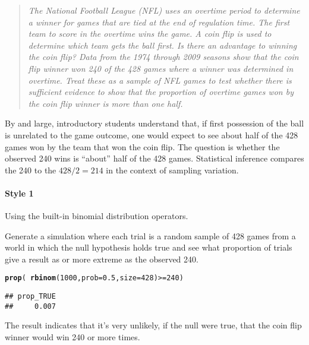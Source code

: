 \documentclass[11pt]{article}\usepackage[]{graphicx}\usepackage[]{color}
\makeatletter
\newcommand{\hlnum}[1]{\textcolor[rgb]{0.686,0.059,0.569}{#1}}%
\newcommand{\hlopt}[1]{\textcolor[rgb]{0,0,0}{#1}}%
\newcommand{\hlstd}[1]{\textcolor[rgb]{0.345,0.345,0.345}{#1}}%
\newcommand{\hlkwc}[1]{\textcolor[rgb]{0.333,0.667,0.333}{#1}}%
\newcommand{\hlkwd}[1]{\textcolor[rgb]{0.737,0.353,0.396}{\textbf{#1}}}%
\newenvironment{kframe}{%
 \def\at@end@of@kframe{}%
 \ifinner\ifhmode%
  \def\at@end@of@kframe{\end{minipage}}%
  \begin{minipage}{\columnwidth}%
 \fi\fi%
 \def\FrameCommand##1{\hskip\@totalleftmargin \hskip-\fboxsep
 \colorbox{shadecolor}{##1}\hskip-\fboxsep
     \hskip-\linewidth \hskip-\@totalleftmargin \hskip\columnwidth}%
 \MakeFramed {\advance\hsize-\width
   \@totalleftmargin\z@ \linewidth\hsize
   \@setminipage}}%
 {\par\unskip\endMakeFramed%
 \at@end@of@kframe}
\newenvironment{knitrout}{}{} %
\makeatother
\begin{document}
\begin{quotation}
{\em The National Football League (NFL) uses an overtime
period to determine a winner for games that are tied at the end of
regulation time.  The first team to score in the overtime wins the
game. A coin flip is used to determine which team gets the ball
first.  Is there an advantage to winning the coin flip?  Data from the
1974 through 2009 seasons show that the coin flip winner won 240 of
the 428 games where a winner was determined in overtime.  Treat these
as a sample of NFL games to test whether there is sufficient evidence
to show that the proportion of overtime games won by the coin flip
winner is more than one half.}
\end{quotation}

By and large, introductory students understand that, if first possession of the ball is unrelated to the game outcome, one would expect to see about half of the 428 games won by the team that won the coin flip.  The question is whether the observed 240 wins is ``about'' half of the 428 games.  Statistical inference compares the 240 to the $428/2 = 214$ in the context of sampling variation.

\paragraph{Style 1} Using the built-in binomial distribution operators.

Generate a simulation where each trial is a random sample of 428
games from a world in which the null hypothesis holds true and see what proportion of 
trials give a result as or more extreme as the observed 240.  

\begin{knitrout}
\color{fgcolor}\begin{kframe}
\begin{alltt}
\hlkwd{prop}\hlstd{(}\hlopt{~} \hlkwd{rbinom}\hlstd{(}\hlnum{1000}\hlstd{,} \hlkwc{prob} \hlstd{=} \hlnum{0.5}\hlstd{,} \hlkwc{size} \hlstd{=} \hlnum{428}\hlstd{)} \hlopt{>=} \hlnum{240}\hlstd{)}
\end{alltt}
\begin{verbatim}
## prop_TRUE 
##     0.007
\end{verbatim}
\end{kframe}
\end{knitrout}

The result indicates that it's very unlikely, if the null were true, that the coin flip winner would win 240 or more times.
\end{document}
